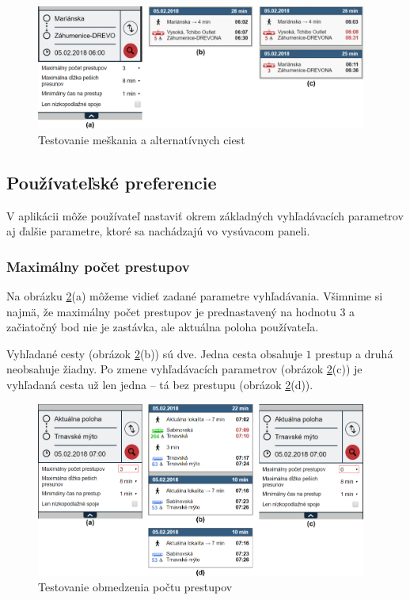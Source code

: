 \begin{figure}[H]
\centerline{\includegraphics[width=0.97\textwidth]{images/test/delay-alternative}}
\caption[Testovanie meškania a alternatívnych ciest]{Testovanie meškania a alternatívnych ciest}
\label{fig:test-delay-alternative}
\end{figure}

\subsection{Používateľské preferencie}

V aplikácii môže používateľ nastaviť okrem základných vyhľadávacích parametrov aj ďalšie parametre, ktoré sa nachádzajú vo vysúvacom paneli. 

\subsubsection{Maximálny počet prestupov}
Na obrázku \ref{fig:test-max-transfers}(a) môžeme vidieť zadané parametre vyhľadávania. Všimnime si najmä, že maximálny počet prestupov je prednastavený na hodnotu $3$ a začiatočný bod nie je zastávka, ale aktuálna poloha používateľa. 

Vyhľadané cesty (obrázok \ref{fig:test-max-transfers}(b)) sú dve. Jedna cesta obsahuje $1$ prestup a druhá neobsahuje žiadny. Po zmene vyhľadávacích parametrov (obrázok \ref{fig:test-max-transfers}(c)) je vyhľadaná cesta už len jedna – tá bez prestupu (obrázok \ref{fig:test-max-transfers}(d)).

\begin{figure}[H]
\centerline{\includegraphics[width=0.97\textwidth]{images/test/max-transfers-act}}
\caption[Testovanie obmedzenia počtu prestupov]{Testovanie obmedzenia počtu prestupov}
\label{fig:test-max-transfers}
\end{figure}

